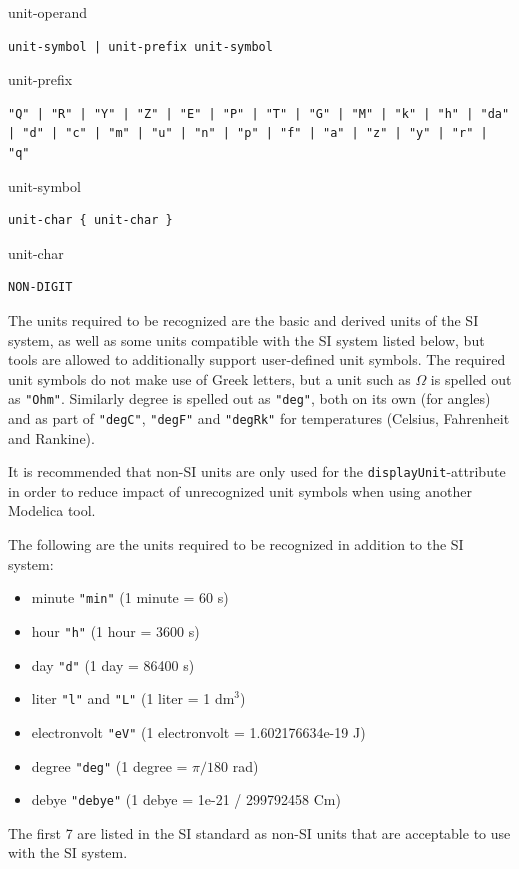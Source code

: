 \begin{production}{unit-operand}
\begin{lstlisting}
unit-symbol | unit-prefix unit-symbol
\end{lstlisting}
\end{production}

\begin{production}{unit-prefix}
\begin{lstlisting}
"Q" | "R" | "Y" | "Z" | "E" | "P" | "T" | "G" | "M" | "k" | "h" | "da"
| "d" | "c" | "m" | "u" | "n" | "p" | "f" | "a" | "z" | "y" | "r" | "q"
\end{lstlisting}
\end{production}

\begin{production}{unit-symbol}
\begin{lstlisting}
unit-char { unit-char }
\end{lstlisting}
\end{production}

\begin{production}{unit-char}
\begin{lstlisting}
NON-DIGIT
\end{lstlisting}
\end{production}

The units required to be recognized are the basic and derived units of the SI system, as well as some units compatible with the SI system listed below, but tools are allowed to additionally support user-defined unit symbols.
The required unit symbols do not make use of Greek letters, but a unit such as $\Omega$ is spelled out as \lstinline!"Ohm"!.
Similarly degree is spelled out as \lstinline!"deg"!, both on its own (for angles) and as part of \lstinline!"degC"!, \lstinline!"degF"! and \lstinline!"degRk"! for temperatures (Celsius, Fahrenheit and Rankine).

It is recommended that non-SI units are only used for the \lstinline!displayUnit!-attribute in order to reduce impact of unrecognized unit symbols when using another Modelica tool.

The following are the units required to be recognized in addition to the SI system:
\begin{itemize}
\item minute \lstinline!"min"! (1 minute = 60 s)
\item hour \lstinline!"h"! (1 hour = 3600 s)
\item day \lstinline!"d"! (1 day = 86400 s)
\item liter \lstinline!"l"! and \lstinline!"L"! (1 liter = 1 $\text{dm}^{3}$)
\item electronvolt \lstinline!"eV"! (1 electronvolt = 1.602176634e-19 J)
\item degree \lstinline!"deg"! (1 degree = $\pi/180$ rad)
\item debye \lstinline!"debye"! (1 debye = 1e-21 / 299792458 Cm)
\end{itemize}
The first 7 are listed in the SI standard as non-SI units that are acceptable to use with the SI system.

